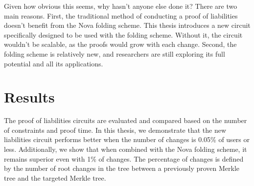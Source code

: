 Given how obvious this seems, why hasn't anyone else done it? 
There are two main reasons. First, the traditional method of conducting a proof of liabilities doesn't benefit from the 
Nova folding scheme. This thesis introduces a new circuit specifically designed to be used with the folding scheme. 
Without it, the circuit wouldn't be scalable, as the proofs would grow with each change. 
Second, the folding scheme is relatively new, and researchers are still exploring its full potential and all its applications.


\section{Results}
The proof of liabilities circuits are evaluated and compared based on the number of constraints and proof time. 
In this thesis, we demonstrate that the new liabilities circuit performs better when the number of changes is 0.05\% of users or less. 
Additionally, we show that when combined with the Nova folding scheme, it remains superior even with 1\% of changes. 
The percentage of changes is defined by the number of root changes in the tree between a previously proven Merkle tree and the targeted Merkle tree.
